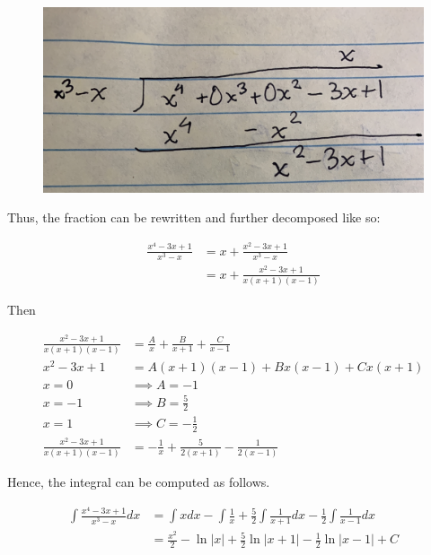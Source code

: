 \documentclass{article}
\begin{document}
    \begin{figure}[hbt!]
        \centering
        \includegraphics[scale=0.1]{longdiv}
    \end{figure}

    Thus, the fraction can be rewritten and further decomposed like so:

    \begin{align*}
        \frac{x^4-3x+1}{x^3-x}  &= x + \frac{x^2-3x+1}{x^3-x} \\
                                &= x + \frac{x^2-3x+1}{x(x+1)(x-1)}
    \end{align*}

    Then

    \begin{align*}
        \frac{x^2-3x+1}{x(x+1)(x-1)}    &= \frac{A}{x} + \frac{B}{x+1} + \frac{C}{x-1} \\
        x^2 - 3x + 1                    &= A(x+1)(x-1) + Bx(x-1) + Cx(x+1) \\
        x = 0                           &\implies A = -1 \\
        x = -1                          &\implies B = \frac{5}{2} \\
        x = 1                           &\implies C = -\frac{1}{2} \\
        \frac{x^2-3x+1}{x(x+1)(x-1)}    &= -\frac{1}{x} + \frac{5}{2(x+1)}-\frac{1}{2(x-1)}
    \end{align*}

    Hence, the integral can be computed as follows.

    \begin{align*}
        \int \frac{x^4-3x+1}{x^3-x}dx   &= \int x dx - \int \frac{1}{x} + \frac{5}{2} \int \frac{1}{x+1}dx - \frac{1}{2}\int \frac{1}{x-1}dx \\
                                        &= \frac{x^2}{2} - \ln{|x|} + \frac{5}{2}\ln{|x+1|} - \frac{1}{2}\ln{|x-1|} + C
    \end{align*}
\end{document}
